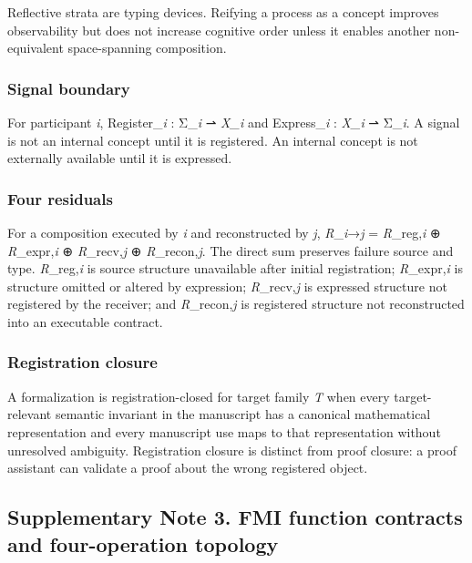 Reflective strata are typing devices. Reifying a process as a concept
improves observability but does not increase cognitive order unless it
enables another non-equivalent space-spanning composition.

\hypertarget{signal-boundary}{%
\subsubsection{Signal boundary}\label{signal-boundary}}

For participant \emph{i}, Register\_\emph{i} : Σ\_\emph{i} ⇀ \emph{X\_i}
and Express\_\emph{i} : \emph{X\_i} ⇀ Σ\_\emph{i}. A signal is not an
internal concept until it is registered. An internal concept is not
externally available until it is expressed.

\hypertarget{four-residuals}{%
\subsubsection{Four residuals}\label{four-residuals}}

For a composition executed by \emph{i} and reconstructed by \emph{j},
\emph{R}\_\emph{i}→\emph{j} = \emph{R}\_reg,\emph{i} ⊕
\emph{R}\_expr,\emph{i} ⊕ \emph{R}\_recv,\emph{j} ⊕
\emph{R}\_recon,\emph{j}. The direct sum preserves failure source and
type. \emph{R}\_reg,\emph{i} is source structure unavailable after
initial registration; \emph{R}\_expr,\emph{i} is structure omitted or
altered by expression; \emph{R}\_recv,\emph{j} is expressed structure
not registered by the receiver; and \emph{R}\_recon,\emph{j} is
registered structure not reconstructed into an executable contract.

\hypertarget{registration-closure}{%
\subsubsection{Registration closure}\label{registration-closure}}

A formalization is registration-closed for target family \emph{T} when
every target-relevant semantic invariant in the manuscript has a
canonical mathematical representation and every manuscript use maps to
that representation without unresolved ambiguity. Registration closure
is distinct from proof closure: a proof assistant can validate a proof
about the wrong registered object.

\hypertarget{supplementary-note-3.-fmi-function-contracts-and-four-operation-topology}{%
\subsection{Supplementary Note 3. FMI function contracts and
four-operation
topology}\label{supplementary-note-3.-fmi-function-contracts-and-four-operation-topology}}

